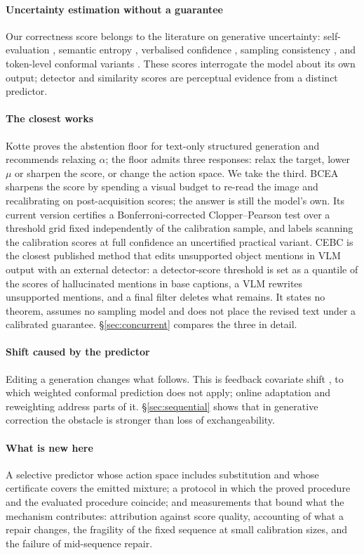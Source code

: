 \paragraph{Uncertainty estimation without a guarantee}
Our correctness score belongs to the literature on generative uncertainty: self-evaluation
\citep{kadavath2022}, semantic entropy \citep{kuhn2023,farquhar2024}, verbalised confidence
\citep{lin2022}, sampling consistency \citep{manakul2023,wang2023selfconsistency}, and token-level
conformal variants \citep{tecp,cover}. These scores interrogate the model about its own output;
detector and similarity scores are perceptual evidence from a distinct predictor.

\paragraph{The closest works}
Kotte \citep{crcimposs} proves the abstention floor for text-only structured generation and
recommends relaxing $\alpha$; the floor admits three responses: relax the target, lower $\mu$ or
sharpen the score, or change the action space. We take the third. BCEA \citep{bcea} sharpens the
score by spending a visual budget to re-read the image and recalibrating on post-acquisition
scores; the answer is still the model's own. Its current version certifies a Bonferroni-corrected
Clopper--Pearson test over a threshold grid fixed independently of the calibration sample, and
labels scanning the calibration scores at full confidence an uncertified practical variant.
CEBC \citep{mishra2026cebc} is the closest published method that edits unsupported object
mentions in VLM output with an external detector: a detector-score threshold is set as a
quantile of the scores of hallucinated mentions in base captions, a VLM rewrites unsupported
mentions, and a final filter deletes what remains. It states no theorem, assumes no sampling
model and does not place the revised text under a calibrated guarantee. \S\ref{sec:concurrent}
compares the three in detail.

\paragraph{Shift caused by the predictor}
Editing a generation changes what follows. This is feedback covariate shift
\citep{fannjiang2022fcs}, to which weighted conformal prediction \citep{tibshirani2019} does not
apply; online adaptation \citep{gibbs2021,onlineabstention} and reweighting \citep{anydist}
address parts of it. \S\ref{sec:sequential} shows that in generative correction the obstacle is
stronger than loss of exchangeability.

\paragraph{What is new here}
A selective predictor whose action space includes substitution and whose certificate covers the
emitted mixture; a protocol in which the proved procedure and the evaluated procedure coincide;
and measurements that bound what the mechanism contributes: attribution against score quality, accounting
of what a repair changes, the fragility of the fixed sequence at small calibration sizes, and the
failure of mid-sequence repair.
